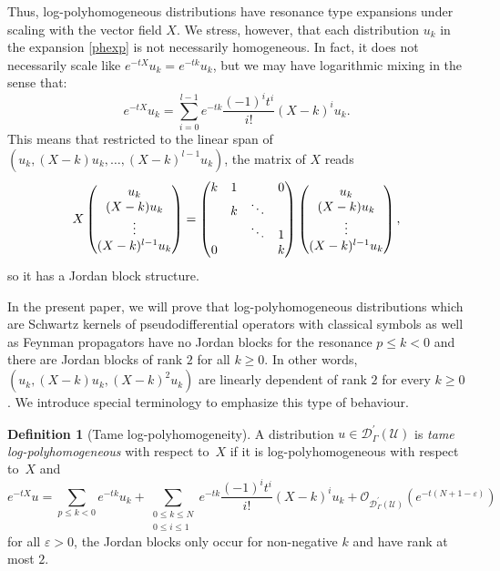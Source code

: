 \documentclass[10pt]{amsart}
\let\pazocal\mathscr
\theoremstyle{definition}
\newtheorem{definition}[theorem]{Definition}
\let\euler X
\begin{document}
Thus, log-polyhomogeneous distributions have resonance type expansions under scaling with the vector field $\euler$.
We stress, however, that each distribution $u_k$ in the expansion \eqref{phexp} is not necessarily homogeneous.
In fact, it does
not necessarily scale like $e^{-t\euler}u_k=e^{-tk}u_k$, but we may have
logarithmic mixing in the sense that:
\[
e^{-t\euler}u_k=\sum_{i=0}^{l-1} e^{-tk} \frac{(-1)^i t^i}{i!}\left(\euler-k\right)^i u_k.
\]
This means that restricted to the linear span of $(u_k,(\euler-k) u_k,\dots,(\euler-k)^{l-1}u_k)$, the matrix of $\euler$
reads
\[\arraycolsep5pt
\euler\begin{pmatrix}
u_k\\
(\euler-k) u_k\\
\vdots \\
(\euler-k)^{l-1}u_k
\end{pmatrix}=
\begin{pmatrix}
k&1& &0\\
&k& \ddots &\\
& &\ddots &1 \\
0 & & &k
\end{pmatrix}
\begin{pmatrix}
u_k\\
(\euler-k) u_k\\
\vdots \\
(\euler-k)^{l-1}u_k
\end{pmatrix},
\]
so it has a Jordan block structure.

In the present paper, we will prove that log-polyhomogeneous distributions which are
Schwartz kernels of pseudodifferential operators with classical symbols as well as Feynman propagators have no Jordan blocks for the resonance $p\leqslant k<0$ and there are Jordan blocks of rank $2$ for all $k\geqslant 0$. In other words,
$(u_k,(\euler-k) u_k, (\euler-k)^2u_k) $ are linearly dependent of rank $2$ for every $k\geqslant 0$.
We introduce special terminology to emphasize this type of behaviour.

\begin{definition}[Tame log-polyhomogeneity]
A distribution $u\in \pazocal{D}^\prime_\Gamma(\pazocal{U})$ is \emph{tame log-polyhomogeneous} with respect to~$\euler$
if it is log-polyhomogeneous with respect to~$\euler$ and
\[
e^{-t\euler}u=\sum_{p\leqslant k<0} e^{-tk} u_k + \sum_{\substack{0\leqslant k\leqslant N\\0\leqslant i\leqslant 1}} e^{-tk} \frac{(-1)^i t^i}{i!}\left(\euler-k\right)^i u_k +\pazocal{O}_{\pazocal{D}^\prime_\Gamma(\pazocal{U})}(e^{-t(N+1-\varepsilon)})
\]
for all $\varepsilon>0$, \ie the Jordan blocks only occur for non-negative $k$ and have rank at most $2$.
\end{definition}
\end{document}
